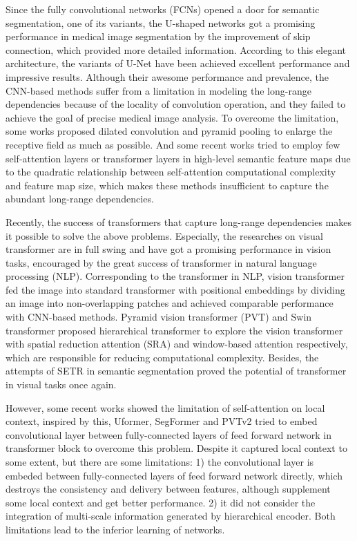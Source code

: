 \documentclass[letterpaper]{article} \usepackage{aaai22}  \usepackage{times}  \usepackage{helvet}  \usepackage{courier}  \usepackage[hyphens]{url}  \usepackage{graphicx} \urlstyle{rm} \def\UrlFont{\rm}  \usepackage{natbib}  \usepackage{caption} \DeclareCaptionStyle{ruled}{labelfont=normalfont,labelsep=colon,strut=off} \frenchspacing  \setlength{\pdfpagewidth}{8.5in}  \setlength{\pdfpageheight}{11in}  \usepackage{algorithm}
\begin{document}
Since the fully convolutional networks (FCNs)\cite{Long2015} opened a door for semantic segmentation, one of its variants, the U-shaped networks\cite{2015U,iek20163D} got a promising performance in medical image segmentation by the improvement of skip connection, which provided more detailed information. According to this elegant architecture, the variants of U-Net\cite{Isensee2021,Zhou2018,huang2020unet} have been achieved excellent performance and impressive results. Although their awesome performance and prevalence, the CNN-based methods suffer from a limitation in modeling the long-range dependencies because of the locality of convolution operation\cite{Cao2021,Xie2021}, and they failed to achieve the goal of precise medical image analysis. To overcome the limitation, some works proposed dilated convolution\cite{Gu2019,Feng2020} and pyramid pooling\cite{zhao2017pyramid} to enlarge the receptive field as much as possible. And some recent works\cite{Xie2021,mou2019cs,Chen2021,Sinha2020} tried to employ few self-attention layers or transformer layers\cite{vaswani2017attention} in high-level semantic feature maps due to the quadratic relationship between self-attention computational complexity and feature map size, which makes these methods insufficient to capture the abundant long-range dependencies.

Recently, the success of transformers that capture long-range dependencies makes it possible to solve the above problems. Especially, the researches on visual transformer\cite{Liu2021,Dosovitskiy2020,Wang2021,Graham2021,Chu2021,Xie2021a,zheng2021rethinking} are in full swing and have got a promising performance in vision tasks, encouraged by the great success of transformer in natural language processing (NLP). Corresponding to the transformer in NLP, vision transformer\cite{Dosovitskiy2020} fed the image into standard transformer with positional embeddings by dividing an image into non-overlapping patches and achieved comparable performance with CNN-based methods. Pyramid vision transformer (PVT)\cite{Wang2021} and Swin transformer\cite{Liu2021} proposed hierarchical transformer to explore the vision transformer with spatial reduction attention (SRA) and window-based attention respectively, which are responsible for reducing computational complexity. Besides, the attempts of SETR\cite{zheng2021rethinking} in semantic segmentation proved the potential of transformer in visual tasks once again. 

However, some recent works\cite{Islam2020,Chu2021a,Li2021} showed the limitation of self-attention on local context, inspired by this, Uformer\cite{Wang2021a}, SegFormer\cite{Xie2021a} and PVTv2\cite{Wang2021b} tried to embed convolutional layer between fully-connected layers of feed forward network in transformer block to overcome this problem. Despite it captured local context to some extent, but there are some limitations: 1) the convolutional layer is embeded between fully-connected layers of feed forward network directly, which destroys the consistency and delivery between features, although supplement some local context and get better performance. 2) it did not consider the integration of multi-scale information generated by hierarchical encoder. Both limitations lead to the inferior learning of networks. 
\end{document}
